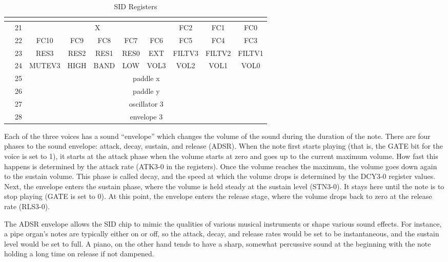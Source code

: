 \begin{table}
\begin{center}
\begin{tabular}{|c|c|c|c|c|c|c|c|c|c|}
            \multicolumn{10}{c}{} \\ \hline

            \multirow{7}{*}{} & 21 & \multicolumn{5}{|c|}{X} & FC2 & FC1 & FC0 \\ \cline{2-10}
            & 22 & FC10 & FC9 & FC8 & FC7 & FC6 & FC5 & FC4 & FC3 \\ \cline{2-10}
            & 23 & RES3 & RES2 & RES1 & RES0 & EXT & FILTV3 & FILTV2 & FILTV1 \\ \cline{2-10}
            & 24 & MUTEV3 & HIGH & BAND & LOW & VOL3 & VOL2 & VOL1 & VOL0 \\ \cline{2-10}
            & 25 & \multicolumn{8}{|c|}{paddle x} \\ \cline{2-10}
            & 26 & \multicolumn{8}{|c|}{paddle y} \\ \cline{2-10}
            & 27 & \multicolumn{8}{|c|}{oscillator 3} \\ \cline{2-10}
            & 28 & \multicolumn{8}{|c|}{envelope 3} \\ \hline
		\end{tabular}
	\end{center}
	\caption{SID Registers}
	\label{tab:sid_registers}
\end{table}

Each of the three voices has a sound ``envelope'' which changes the volume of the sound during the duration of the note. There are four phases to the sound envelope: attack, decay, sustain, and release (ADSR). When the note first starts playing (that is, the GATE bit for the voice is set to 1), it starts at the attack phase when the volume starts at zero and goes up to the current maximum volume. How fast this happens is determined by the attack rate (ATK3-0 in the registers). Once the volume reaches the maximum, the volume goes down again to the sustain volume. This phase is called decay, and the speed at which the volume drops is determined by the DCY3-0 register values. Next, the envelope enters the sustain phase, where the volume is held steady at the sustain level (STN3-0). It stays here until the note is to stop playing (GATE is set to 0). At this point, the envelope enters the release stage, where the volume drops back to zero at the release rate (RLS3-0).

The ADSR envelope allows the SID chip to mimic the qualities of various musical instruments or shape various sound effects. For instance, a pipe organ's notes are typically either on or off, so the attack, decay, and release rates would be set to be instantaneous, and the sustain level would be set to full. A piano, on the other hand tends to have a sharp, somewhat percussive sound at the beginning with the note holding a long time on release if not dampened.

